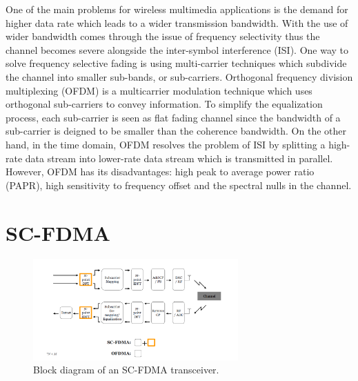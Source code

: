 \documentclass[12pt,a4paper,notitlepage,twoside,headsepline]{scrartcl}
\begin{document}


One of the main problems for wireless multimedia applications is the demand for higher data rate which leads to a wider transmission bandwidth. With the use of wider bandwidth comes through the issue of frequency selectivity thus the channel becomes severe alongside the inter-symbol interference (ISI). One way to solve frequency selective fading is using multi-carrier techniques which subdivide the channel into smaller sub-bands, or sub-carriers. Orthogonal frequency division multiplexing (OFDM) is a multicarrier modulation technique which uses orthogonal sub-carriers to convey information. To simplify the equalization process, each sub-carrier is seen as flat fading channel since the bandwidth of a sub-carrier is deigned to be smaller than the coherence bandwidth. On the other hand, in the time domain, OFDM resolves the problem of ISI by splitting a high-rate data stream into lower-rate data stream which is transmitted in parallel. However, OFDM has its disadvantages: high peak to average power ratio (PAPR), high sensitivity to frequency offset and the spectral nulls in the channel.


\section{SC-FDMA}

\begin{figure}[!ht]
\begin{center}
\includegraphics[width=0.7\textwidth]{figures/fig1}
\end{center}
\caption{Block diagram of an SC-FDMA transceiver.} %
\label{fig:example}
\end{figure}
\end{document}
